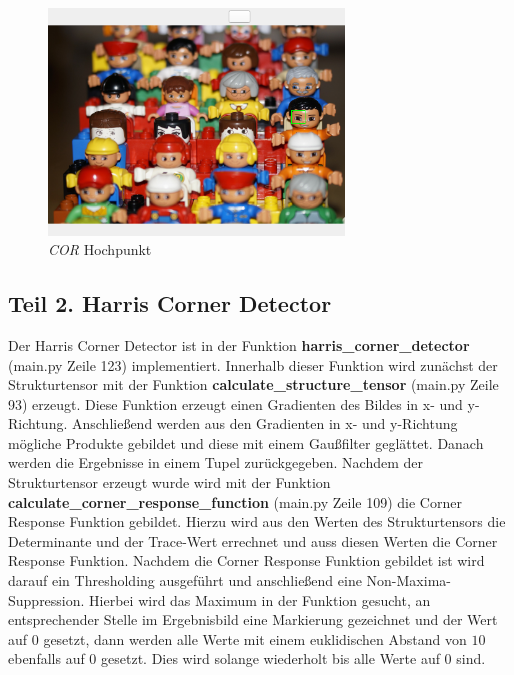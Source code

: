 \documentclass[12pt]{article}
\begin{document}
\begin{figure}[H]
  \centering
  \includegraphics[width=0.7\textwidth, keepaspectratio]{cor_match.png}\\
  \textit{COR} Hochpunkt
\end{figure}

\newpage

\subsection*{Teil 2. Harris Corner Detector}
Der Harris Corner Detector ist in der Funktion \textbf{harris\_corner\_detector} (main.py Zeile 123) implementiert. Innerhalb dieser Funktion wird zunächst der Strukturtensor mit der Funktion \textbf{calculate\_structure\_tensor} (main.py Zeile 93) erzeugt. Diese Funktion erzeugt einen Gradienten des Bildes in x- und y-Richtung. Anschließend werden aus den Gradienten in x- und y-Richtung mögliche Produkte gebildet und diese mit einem Gaußfilter geglättet. Danach werden die Ergebnisse in einem Tupel zurückgegeben.
Nachdem der Strukturtensor erzeugt wurde wird mit der Funktion \textbf{calculate\_corner\_response\_function} (main.py Zeile 109) die Corner Response Funktion gebildet. Hierzu wird aus den Werten des Strukturtensors die Determinante und der Trace-Wert errechnet und auss diesen Werten die Corner Response Funktion.
Nachdem die Corner Response Funktion gebildet ist wird darauf ein Thresholding ausgeführt und anschließend eine Non-Maxima-Suppression. Hierbei wird das Maximum in der Funktion gesucht, an entsprechender Stelle im Ergebnisbild eine Markierung gezeichnet und der Wert auf 0 gesetzt, dann werden alle Werte mit einem euklidischen Abstand von $10$ ebenfalls auf 0 gesetzt. Dies wird solange wiederholt bis alle Werte auf 0 sind. 
\end{document}
